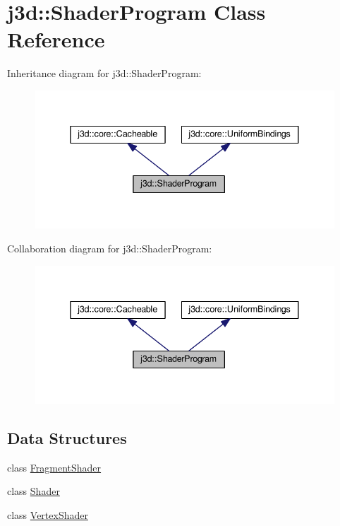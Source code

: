 \hypertarget{classj3d_1_1ShaderProgram}{}\section{j3d\+:\+:Shader\+Program Class Reference}
\label{classj3d_1_1ShaderProgram}


Inheritance diagram for j3d\+:\+:Shader\+Program\+:
\nopagebreak
\begin{figure}[H]
\begin{center}
\leavevmode
\includegraphics[width=338pt]{classj3d_1_1ShaderProgram__inherit__graph}
\end{center}
\end{figure}


Collaboration diagram for j3d\+:\+:Shader\+Program\+:
\nopagebreak
\begin{figure}[H]
\begin{center}
\leavevmode
\includegraphics[width=338pt]{classj3d_1_1ShaderProgram__coll__graph}
\end{center}
\end{figure}
\subsection*{Data Structures}
\begin{DoxyCompactItemize}
\item 
class \hyperlink{classj3d_1_1ShaderProgram_1_1FragmentShader}{Fragment\+Shader}
\item 
class \hyperlink{classj3d_1_1ShaderProgram_1_1Shader}{Shader}
\item 
class \hyperlink{classj3d_1_1ShaderProgram_1_1VertexShader}{Vertex\+Shader}
\end{DoxyCompactItemize}
